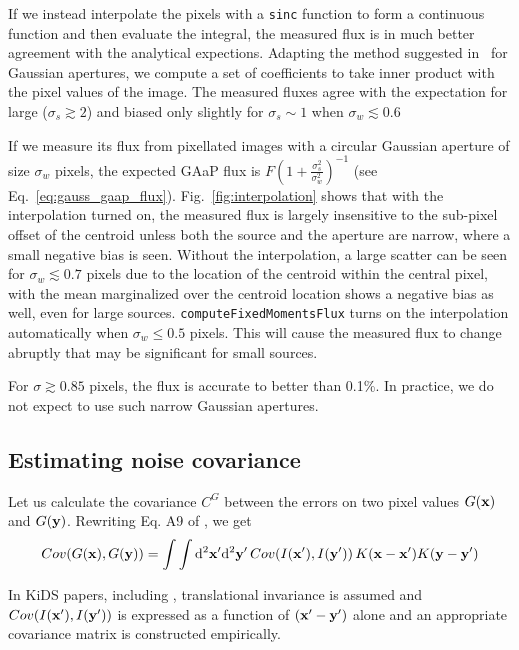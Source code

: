 \documentclass[DM,lsstdraft, authoryear,toc]{lsstdoc}
\newcommand{\rmd}{\mathrm{d}^2}
\begin{document}
If we instead interpolate the pixels with a \texttt{sinc} function to form a continuous function and then evaluate the integral, the measured flux is in much better agreement with the analytical expections.
Adapting the method suggested in~\cite{Bickerton2013} for Gaussian apertures, we compute a set of coefficients to take inner product with the pixel values of the image.
The measured fluxes agree with the expectation for large ($\sigma_s \gtrsim 2$) and biased only slightly for $\sigma_s \sim 1$ when $\sigma_w \lesssim 0.6$

If we measure its flux from pixellated images with a circular Gaussian aperture of size $\sigma_w$ pixels, the expected GAaP flux is $F\left(1+\frac{\sigma_s^2}{\sigma_w^2}\right)^{-1}$ (see Eq.~\ref{eq:gauss_gaap_flux}).
Fig.~\ref{fig:interpolation} shows that with the interpolation turned on, the measured flux is largely insensitive to the sub-pixel offset of the centroid unless both the source and the aperture are narrow, where a small negative bias is seen.
Without the interpolation, a large scatter can be seen for $\sigma_w \lesssim 0.7$ pixels due to the location of the centroid within the central pixel, with the mean marginalized over the centroid location shows a negative bias as well, even for large sources.
\texttt{computeFixedMomentsFlux} turns on the interpolation automatically when $\sigma_w \le 0.5$ pixels.
This will cause the measured flux to change abruptly that may be significant for small sources.

For $\sigma \gtrsim 0.85$ pixels, the flux is accurate to better than 0.1\%.
In practice, we do not expect to use such narrow Gaussian apertures.

\subsection{Estimating noise covariance}
Let us calculate the covariance $C^G$ between the errors on two pixel values $G({\bf x})$ and $G({\bf y})$. Rewriting Eq. A9 of \cite{Kuijken2015}, we get
\begin{equation}
  Cov(G({\bf x}), G({\bf y})) = \int\int\rmd{\bf x}'\rmd{\bf y}'\, Cov(I({\bf x}'),I({\bf y}'))\, K({\bf x}-{\bf x}')K({\bf y}-{\bf y}')
\end{equation}

In KiDS papers, including \cite{Kuijken2015}, translational invariance is assumed and $Cov(I({\bf x}'),I({\bf y}'))$ is expressed as a function of $({\bf x}'-{\bf y}')$ alone and an appropriate covariance matrix is constructed empirically.
\end{document}
